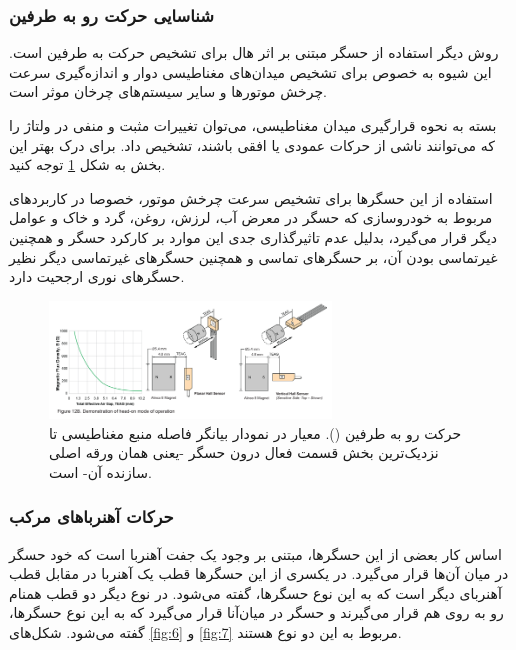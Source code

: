 \documentclass[conference]{IEEEtran-ModifiedForMVIP}
\begin{document}
\subsubsection{شناسایی حرکت رو به طرفین}


روش دیگر استفاده از حسگر مبتنی بر اثر هال برای تشخیص حرکت به طرفین است. این شیوه به خصوص برای تشخیص میدان‌های مغناطیسی دوار و اندازه‌گیری سرعت چرخش موتور‌ها و سایر سیستم‌های چرخان موثر است.

بسته به نحوه قرارگیری میدان مغناطیسی، می‌توان تغییرات مثبت و منفی در ولتاژ را که می‌توانند ناشی از حرکات عمودی یا افقی باشند، تشخیص داد. برای درک بهتر این بخش به شکل
\ref{fig:5}
توجه کنید.

استفاده از این حسگر‌ها برای تشخیص سرعت چرخش موتور، خصوصا در کاربردهای مربوط به خودروسازی که حسگر در معرض آب، لرزش، روغن، گرد و خاک و عوامل دیگر قرار می‌گیرد، بدلیل عدم تاثیرگذاری جدی این موارد بر کارکرد حسگر و همچنین غیرتماسی بودن آن، بر حسگر‌های تماسی و همچنین حسگر‌های غیرتماسی دیگر نظیر حسگر‌های نوری ارجحیت دارد. \cite{ele_hall_2013}

	
\begin{figure}[t]
	
	\centering 
	\includegraphics[width=75mm]{Images/side}
	\caption{حرکت رو به طرفین ().
		معیار  در نمودار بیانگر فاصله منبع مغناطیسی تا نزدیک‌ترین بخش قسمت فعال درون حسگر -یعنی همان ورقه اصلی سازنده آن- است.
		\cite{alleg}	
	}\label{fig:5}
\end{figure}


\subsubsection{حرکات آهنربا‌های مرکب}

اساس کار بعضی از این حسگرها، مبتنی بر وجود یک جفت آهنربا است که خود حسگر در میان آن‌ها قرار می‌گیرد. در یکسری از این حسگر‌ها قطب  یک آهنربا در مقابل قطب  آهنربای دیگر است که به این نوع حسگر‌ها،  گفته می‌شود. در نوع دیگر دو قطب همنام  رو به روی هم قرار می‌گیرند و حسگر در میان‌آنا قرار می‌گیرد که به این نوع حسگر‌ها،  گفته می‌شود. شکل‌های 
\ref{fig:6}
و
\ref{fig:7}
مربوط به این دو نوع هستند. \cite{alleg}
\end{document}
